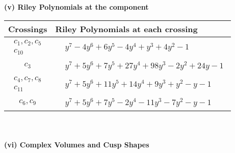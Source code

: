 \documentclass[1p]{elsarticle_modified}
\theoremstyle{definition}
\begin{document}
\flushleft \textbf{(v) Riley Polynomials at the component}\newline \\
\begin{tabular}{m{50pt}|m{274pt}}
Crossings & \hspace{64pt}Riley Polynomials at each crossing \\
\hline $$\begin{aligned}c_{1},c_{2},c_{5}\\c_{10}\end{aligned}$$&$\begin{aligned}
&y^7-4 y^6+6 y^5-4 y^4+y^3+4 y^2-1
\end{aligned}$\\
\hline $$\begin{aligned}c_{3}\end{aligned}$$&$\begin{aligned}
&y^7+5 y^6+7 y^5+27 y^4+98 y^3-2 y^2+24 y-1
\end{aligned}$\\
\hline $$\begin{aligned}c_{4},c_{7},c_{8}\\c_{11}\end{aligned}$$&$\begin{aligned}
&y^7+5 y^6+11 y^5+14 y^4+9 y^3+y^2- y-1
\end{aligned}$\\
\hline $$\begin{aligned}c_{6},c_{9}\end{aligned}$$&$\begin{aligned}
&y^7+5 y^6+7 y^5-2 y^4-11 y^3-7 y^2- y-1
\end{aligned}$\\
\hline
\end{tabular}\\~\\
\newpage\flushleft \textbf{(vi) Complex Volumes and Cusp Shapes}
\end{document}
